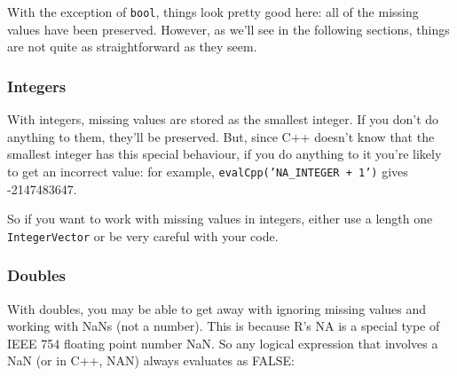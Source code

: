 \begin{Shaded}
\begin{Highlighting}[]
  

   
   
   

   
\NormalTok{\}}
\end{Highlighting}
\end{Shaded}

\begin{Shaded}
\begin{Highlighting}[]
\NormalTok{(}\NormalTok{())}
\end{Highlighting}
\end{Shaded}

With the exception of \texttt{bool}, things look pretty good here: all
of the missing values have been preserved. However, as we'll see in the
following sections, things are not quite as straightforward as they
seem.

\subsubsection{Integers}

With integers, missing values are stored as the smallest integer. If you
don't do anything to them, they'll be preserved. But, since C++ doesn't
know that the smallest integer has this special behaviour, if you do
anything to it you're likely to get an incorrect value: for example,
\texttt{evalCpp('NA\_INTEGER + 1')} gives -2147483647.

So if you want to work with missing values in integers, either use a
length one \texttt{IntegerVector} or be very careful with your code.

\subsubsection{Doubles}

With doubles, you may be able to get away with ignoring missing values
and working with NaNs (not a number). This is because R's NA is a
special type of IEEE 754 floating point number NaN. So any logical
expression that involves a NaN (or in C++, NAN) always evaluates as
FALSE:

